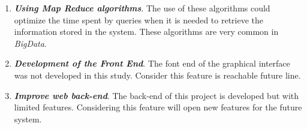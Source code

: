 \begin{enumerate}
\item \textbf{\textit{Using Map Reduce algorithms}}. The use of these algorithms could optimize the time spent by queries when it is needed to retrieve the information stored in the system. These algorithms are very common in \textit{BigData}.

\item \textbf{\textit{Development of the Front End}}. The font end of the graphical interface was not developed in this study. Consider this feature is reachable future line.

\item \textbf{\textit{Improve web back-end}}. The back-end of this project is developed but with limited features. Considering this feature will open new features for the future system.

\end{enumerate}




\newpage